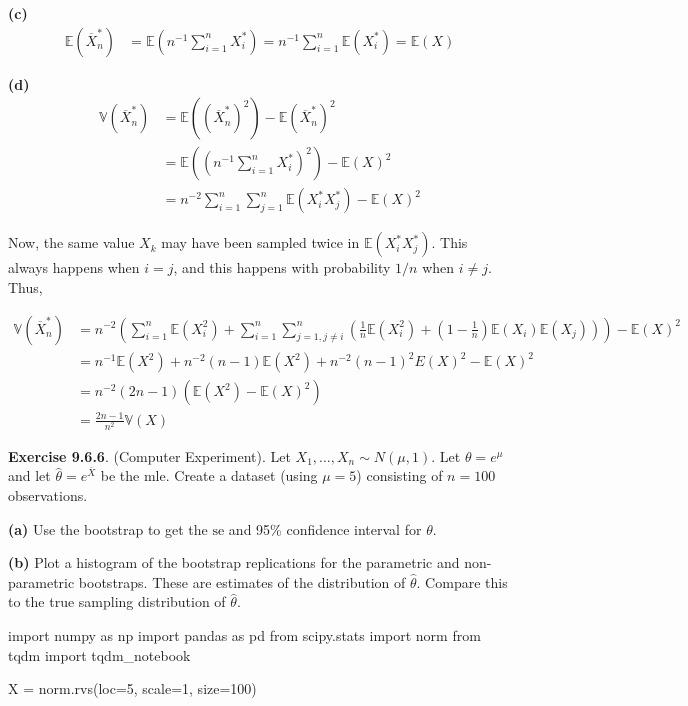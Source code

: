 \textbf{(c)} \begin{align}
\mathbb{E}(\overline{X}_n^*) &= \mathbb{E}\left(n^{-1} \sum_{i=1}^nX_i^*\right) = n^{-1} \sum_{i=1}^n \mathbb{E}(X_i^*) = \mathbb{E}(X)
\end{align}

\textbf{(d)} \begin{align}
\mathbb{V}(\overline{X}_n^*) &= \mathbb{E}((\overline{X}_n^*)^2) - \mathbb{E}(\overline{X}_n^*)^2 \\
&= \mathbb{E}\left(\left(n^{-1} \sum_{i=1}^nX_i^*\right)^2\right) - \mathbb{E}(X)^2 \\
&= n^{-2} \sum_{i=1}^n\sum_{j=1}^n \mathbb{E}(X_i^* X_j^*) - \mathbb{E}(X)^2
\end{align}

Now, the same value \(X_k\) may have been sampled twice in
\(\mathbb{E}(X_i^* X_j^*)\). This always happens when \(i = j\), and
this happens with probability \(1 / n\) when \(i \neq j\). Thus,

\begin{align}
\mathbb{V}(\overline{X}_n^*) 
&= n^{-2} \left(\sum_{i=1}^n \mathbb{E}(X_i^2) + \sum_{i=1}^n \sum_{j=1, j \neq i}^n \left( \frac{1}{n} \mathbb{E}(X_i^2) + \left(1 - \frac{1}{n}\right)\mathbb{E}(X_i)\mathbb{E}(X_j)\right) \right) - \mathbb{E}(X)^2 \\
&= n^{-1} \mathbb{E}(X^2) + n^{-2} (n-1) \mathbb{E}(X^2) + n^{-2}(n-1)^2 E(X)^2 - \mathbb{E}(X)^2 \\
&= n^{-2} (2n - 1) \left( \mathbb{E}(X^2) - \mathbb{E}(X)^2 \right) \\
&= \frac{2n - 1}{n^2} \mathbb{V}(X)
\end{align}

\textbf{Exercise 9.6.6}. (Computer Experiment). Let
\(X_1, \dots, X_n \sim N(\mu, 1)\). Let \(\theta = e^\mu\)and let
\(\hat{\theta} = e^{\overline{X}}\) be the mle. Create a dataset (using
\(\mu = 5\)) consisting of \(n = 100\) observations.

\textbf{(a)} Use the bootstrap to get the \(\text{se}\) and 95\%
confidence interval for \(\theta\).

\textbf{(b)} Plot a histogram of the bootstrap replications for the
parametric and non-parametric bootstraps. These are estimates of the
distribution of \(\hat{\theta}\). Compare this to the true sampling
distribution of \(\hat{\theta}\).

\begin{python}
import numpy as np
import pandas as pd
from scipy.stats import norm
from tqdm import tqdm_notebook

X = norm.rvs(loc=5, scale=1, size=100)
\end{python}

